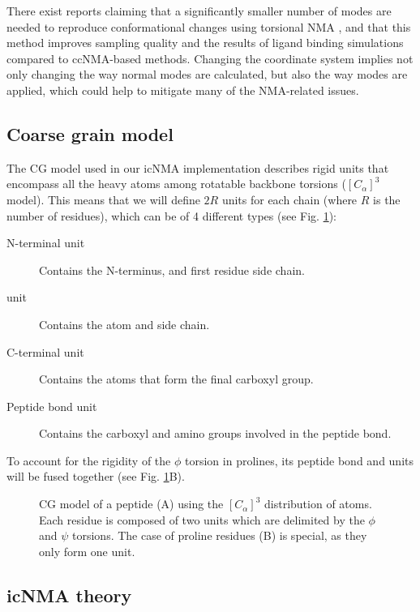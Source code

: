 There exist reports claiming that a significantly smaller number of modes are needed to reproduce conformational changes using torsional NMA \cite{bray_optimized_2011}, and that this method improves sampling quality \cite{mendez_torsional_2010-1} and the results of ligand binding simulations \cite{kovacs_conformational_2005} compared to ccNMA-based methods. Changing the coordinate system  implies not only changing the way normal modes are calculated, but also the way modes are applied, which could help to mitigate many of the NMA-related issues.

\subsection{Coarse grain model}
The CG model used in our icNMA implementation describes rigid units that encompass all the heavy atoms among rotatable backbone torsions ($[C_\alpha]^3$ \cite{ghysels_mobile_2009, ghysels_comparative_2010} model). This means that we will define \around$2R$ units for each chain (where $R$ is the number of residues), which can be of 4 different types (see Fig. \ref{fig:icNMA_CG}):

\begin{description}
\item [N-terminal unit] Contains the N-terminus, \calpha and first residue side chain.
\item [\calpha unit] Contains the \calpha atom and side chain.
\item [C-terminal unit] Contains the atoms that form the final carboxyl group.
\item [Peptide bond unit] Contains the carboxyl and amino groups involved in the peptide bond.
\end{description}

To account for the rigidity of the $\phi$ torsion in prolines, its peptide bond and \calpha units will be fused together (see Fig. \ref{fig:icNMA_CG}B).

\begin{figure}
\caption{CG model of a peptide (A) using the $[C_\alpha]^3$ distribution of atoms. Each residue is composed of two units which are delimited by the $\phi$ and $\psi$ torsions. The case of proline residues (B) is special, as they only form one unit.}
\label{fig:icNMA_CG}
\end{figure}

\subsection{icNMA theory}

